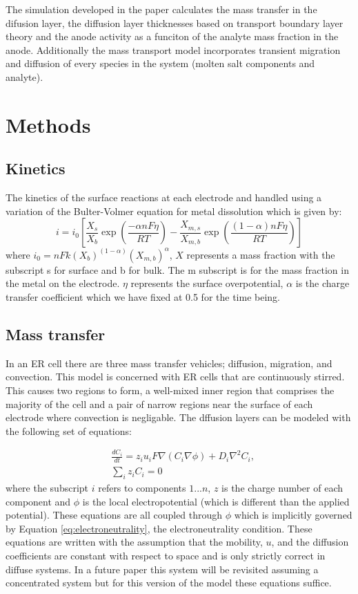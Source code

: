 \documentclass[journal=mamobx]{achemso}
\begin{document}
The simulation developed in the paper calculates the mass transfer in the difusion layer, the diffusion layer thicknesses based on transport boundary layer theory and the anode activity as a funciton of the analyte mass fraction in the anode. 
Additionally the mass transport model incorporates transient migration and diffusion of every species in the system (molten salt components and analyte).


\section{Methods}
\subsection{Kinetics}
The kinetics of the surface reactions at each electrode and handled using a variation of the Bulter-Volmer equation for metal dissolution which is given by:
\begin{equation}
  i = i_0\left [\frac{X_s}{X_b}\exp\left (\frac{-\alpha nF\eta}{RT}\right ) 
- \frac{X_{m,s}}{X_{m,b}}\exp\left (\frac{(1-\alpha)nF\eta}{RT}\right )\right ]
\end{equation}
where $i_0 = nFk(X_b)^{(1-\alpha)}(X_{m,b})^\alpha$, $X$ represents a mass fraction with the subscript s for surface and b for bulk.
The m subscript is for the mass fraction in the metal on the electrode. $\eta$ represents the surface overpotential, $\alpha$ is the charge transfer coefficient which we have fixed at 0.5 for the time being.  
\subsection{Mass transfer}
In an ER cell there are three mass transfer vehicles; diffusion, migration, and convection. 
This model is concerned with ER cells that are continuously stirred. 
This causes two regions to form, a well-mixed inner region that comprises the majority of the cell and a pair of narrow regions near the surface of each electrode where convection is negligable.
The dffusion layers can be modeled with the following set of equations:

\begin{align}
    & \frac{dC_i}{dt} = z_iu_iF\nabla (C_i\nabla \phi) + D_i \nabla^2C_i, \label{eq:migration_diffusion}\\ 
    & \sum_i z_i C_i = 0 \label{eq:electroneutrality}
\end{align}
where the subscript $i$ refers to components ${1...n}$, $z$ is the charge number of each component and $\phi$ is the local electropotential (which is different than the applied potential).
These equations are all coupled through $\phi$ which is implicitly governed by Equation \ref{eq:electroneutrality}, the electroneutrality condition.
These equations are written with the assumption that the mobility, $u$, and the diffusion coefficients are constant with respect to space and is only strictly correct in diffuse systems. 
In a future paper this system will be revisited assuming a concentrated system but for this version of the model these equations suffice.
\end{document}
